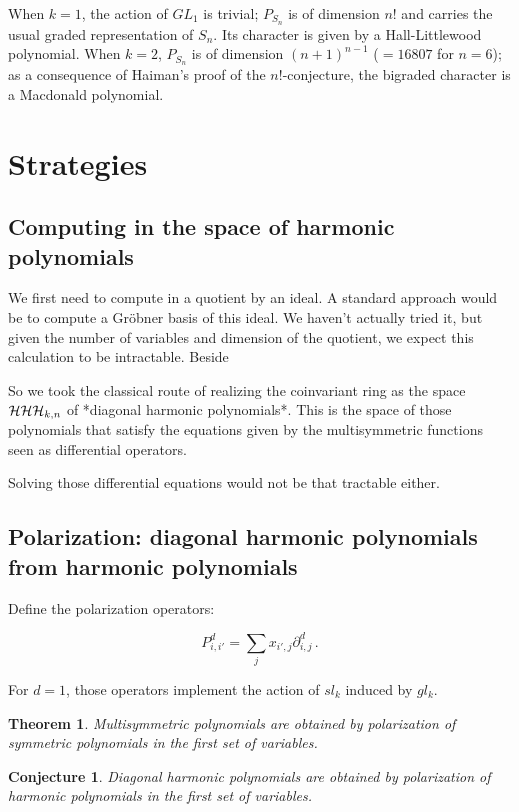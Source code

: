 \documentclass[letter,12pt]{article}
\DeclareMathOperator{\harmonics}{\mathcal{H}}
\newtheorem{theorem}{Theorem}
\newtheorem{conjecture}{Conjecture}
\begin{document}
	When $k=1$, the action of $GL_1$ is trivial; $P_{S_n}$ is of dimension $n!$ and carries the usual graded representation of $S_n$. Its character is given by a Hall-Littlewood polynomial.
	When $k=2$, $P_{S_n}$ is of dimension $(n+1)^{n-1}$ ($=16807$ for $n=6$); as a consequence of Haiman's proof of the $n!$-conjecture, the bigraded character is a Macdonald polynomial.
	
	\section{Strategies}
	
	\subsection{Computing in the space of harmonic polynomials}
	
	We first need to compute in a quotient by an ideal.
	A standard approach would be to compute a Gröbner basis of this ideal.
	We haven't actually tried it, but given the number of variables and dimension of the quotient, we expect this calculation to be intractable.
	Beside 
	
	So we took the classical route of realizing the coinvariant ring as the space $\def\harmonics{\mathcal{H}}\harmonics_{k,n}$ of *diagonal harmonic polynomials*.
	This is the space of those polynomials that satisfy the equations given by the multisymmetric functions seen as differential operators.
	
	Solving those differential equations would not be that tractable either.
	
	\subsection{Polarization: diagonal harmonic polynomials from harmonic polynomials}
	
	Define the polarization operators:
	
	$$P_{i,i'}^d = \sum_j   x_{i',j} \partial_{i,j}^d\,.$$
	
	For $d=1$, those operators implement the action of $sl_k$ induced by $gl_k$.
	
	\begin{theorem}
		Multisymmetric polynomials are obtained by polarization of symmetric polynomials in the first set of variables.
	\end{theorem}
	
	\begin{conjecture}
		Diagonal harmonic polynomials are obtained by polarization of harmonic polynomials in the first set of variables.
	\end{conjecture}
	
\end{document}
